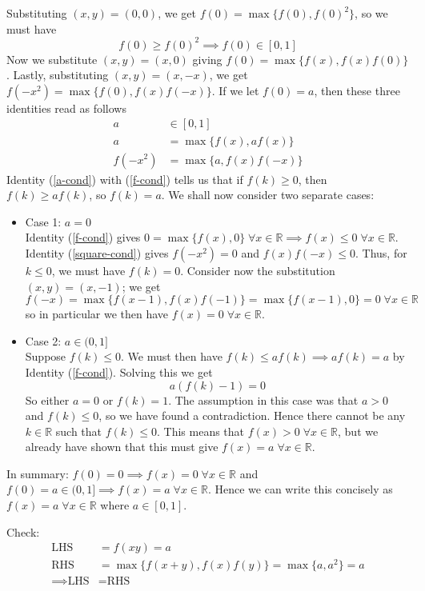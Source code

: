 \documentclass{article}
\begin{document}
\begin{enumerate}[1.]
Substituting $(x, y) = (0, 0)$, we get $f(0) = \max\{f(0), f(0)^2\}$, so we must have 
$$f(0) \ge f(0)^2 \implies f(0) \in [0, 1]$$ 
Now we substitute $(x, y) = (x, 0)$ giving $f(0) = \max\{f(x), f(x)f(0)\}$. Lastly, substituting $(x, y) = (x, -x)$, we get $f(-x^2) = \max\{f(0), f(x)f(-x)\}$. If we let $f(0) = a$, then these three identities read as follows
\begin{align}
a &\in [0, 1] \label{a-cond}\\
a &= \max\{f(x), af(x)\} \label{f-cond}\\
f(-x^2) &= \max\{a, f(x)f(-x)\} \label{square-cond}
\end{align}
Identity (\ref{a-cond}) with (\ref{f-cond}) tells us that if $f(k) \ge 0$, then $f(k) \ge af(k)$, so $f(k) = a$. We shall now consider two separate cases:
\begin{itemize}
  \item Case 1: $a = 0$ \\
  Identity (\ref{f-cond}) gives $0 = \max\{f(x), 0\} \; \forall x \in \mathbb{R} \implies f(x) \le 0 \; \forall x \in \mathbb{R}$. Identity (\ref{square-cond}) gives $f(-x^2) = 0$ and $f(x)f(-x) \le 0$. Thus, for $k \le 0$, we must have $f(k) = 0$. Consider now the substitution $(x,y) = (x, -1)$; we get 
  $$f(-x) = \max\{f(x - 1), f(x)f(-1)\} = \max\{f(x - 1), 0\} = 0 \; \forall x \in \mathbb{R}$$ 
  so in particular we then have $f(x) = 0 \; \forall x \in \mathbb{R}$.
  \item Case 2: $a \in (0, 1]$ \\
  Suppose $f(k) \le 0$. We must then have $f(k) \le af(k) \implies af(k) = a$ by Identity (\ref{f-cond}). Solving this we get 
  $$a(f(k) - 1) = 0 $$
  So either $a = 0$ or $f(k) = 1$. The assumption in this case was that $a > 0$ and $f(k) \le 0$, so we have found a contradiction. Hence there cannot be any $k \in \mathbb{R}$ such that $f(k) \le 0$. This means that $f(x) > 0 \; \forall x \in \mathbb{R}$, but we already have shown that this must give $f(x) = a \; \forall x \in \mathbb{R}$.
\end{itemize}
In summary: $f(0) = 0 \implies f(x) = 0 \; \forall x \in \mathbb{R}$ and $f(0) = a \in (0, 1] \implies f(x) = a \; \forall x \in \mathbb{R}$. Hence we can write this concisely as $f(x) = a \; \forall x \in \mathbb{R}$ where $a \in [0, 1]$.

Check:
\begin{align*}
  \text{LHS} &= f(xy) = a \\
  \text{RHS} &= \max\{f(x + y), f(x)f(y) \} = \max\{a, a^2\} = a \\
  \implies \text{LHS} &= \text{RHS}
\end{align*}

\end{enumerate}
\end{document}
